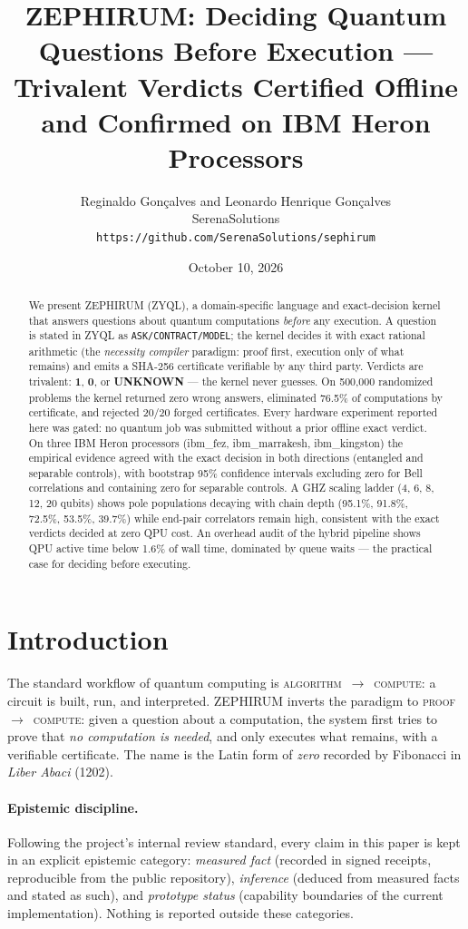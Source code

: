 \documentclass[11pt]{article}
\title{ZEPHIRUM: Deciding Quantum Questions Before Execution ---\\
Trivalent Verdicts Certified Offline and Confirmed on IBM Heron Processors}
\author{Reginaldo Gon\c{c}alves and Leonardo Henrique Gon\c{c}alves\\
SerenaSolutions\\
\texttt{https://github.com/SerenaSolutions/sephirum}}
\date{October 10, 2026}
\begin{document}
\maketitle

\begin{abstract}
We present ZEPHIRUM (ZYQL), a domain-specific language and exact-decision
kernel that answers questions about quantum computations \emph{before} any
execution. A question is stated in ZYQL as
\texttt{ASK/CONTRACT/MODEL}; the kernel decides it with exact rational
arithmetic (the \emph{necessity compiler} paradigm: proof first, execution
only of what remains) and emits a SHA-256 certificate verifiable by any
third party. Verdicts are trivalent: \textbf{1}, \textbf{0}, or
\textbf{UNKNOWN} --- the kernel never guesses. On 500{,}000 randomized
problems the kernel returned zero wrong answers, eliminated 76.5\% of
computations by certificate, and rejected 20/20 forged certificates.
Every hardware experiment reported here was gated: no quantum job was
submitted without a prior offline exact verdict. On three IBM Heron
processors (ibm\_fez, ibm\_marrakesh, ibm\_kingston) the empirical evidence
agreed with the exact decision in both directions (entangled and
separable controls), with bootstrap 95\% confidence intervals excluding
zero for Bell correlations and containing zero for separable controls. A
GHZ scaling ladder (4, 6, 8, 12, 20 qubits) shows pole populations decaying
with chain depth (95.1\%, 91.8\%, 72.5\%, 53.5\%, 39.7\%) while end-pair
correlators remain high, consistent with the exact verdicts decided at
zero QPU cost. An overhead audit of the hybrid pipeline shows QPU active
time below 1.6\% of wall time, dominated by queue waits --- the practical
case for deciding before executing.
\end{abstract}

\section{Introduction}
The standard workflow of quantum computing is
\textsc{algorithm}~$\rightarrow$~\textsc{compute}: a circuit is built, run,
and interpreted. ZEPHIRUM inverts the paradigm to
\textsc{proof}~$\rightarrow$~\textsc{compute}: given a question about a
computation, the system first tries to prove that \emph{no computation is
needed}, and only executes what remains, with a verifiable certificate.
The name is the Latin form of \emph{zero} recorded by Fibonacci in
\emph{Liber Abaci} (1202).

\paragraph{Epistemic discipline.}
Following the project's internal review standard, every claim in this paper is
kept in an explicit epistemic category: \emph{measured fact} (recorded in
signed receipts, reproducible from the public repository), \emph{inference}
(deduced from measured facts and stated as such), and \emph{prototype status}
(capability boundaries of the current implementation). Nothing is reported
outside these categories.
\end{document}
